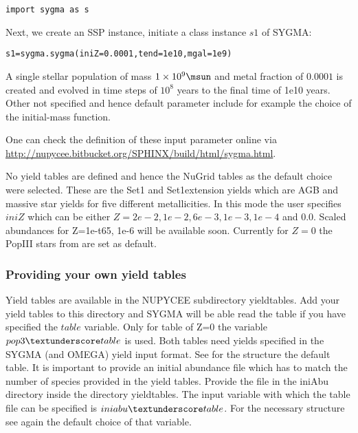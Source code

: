 \begin{verbatim}
import sygma as s
\end{verbatim}

Next, we create an SSP instance, initiate a class instance $s1$ of SYGMA:


\begin{verbatim}
s1=sygma.sygma(iniZ=0.0001,tend=1e10,mgal=1e9)
\end{verbatim}

A single stellar population of mass $1\times10^{9}\msun$ and metal fraction
of $0.0001$ is created and evolved in time steps of $10^{8}$ years
to the final time of 1e10 years. Other not specified and hence
default parameter include for example the choice of the initial-mass function.


One can check the definition of these input parameter online via
\url{http://nupycee.bitbucket.org/SPHINX/build/html/sygma.html}.


No yield tables are defined and hence the NuGrid tables as the
default choice were selected. These are the Set1 and Set1extension
yields which are
AGB and massive star yields for five different metallicities.
In this mode the user specifies $iniZ$
which can be either $Z=2e-2, 1e-2, 6e-3, 1e-3, 1e-4$ and $0.0$.
Scaled abundances for Z=1e-t65, 1e-6 will be available soon.
Currently for $Z=0$ the PopIII stars from \cite{heger:10} are set
as default.

\subsubsection{Providing your own yield tables}

Yield tables are available in the NUPYCEE subdirectory 
yield\textunderscore tables. Add your yield tables to
this directory and SYGMA will be able read the table
if you have specified the $table$ variable. Only
for table of Z=0 the variable $pop3\textunderscore table$ is used.
Both tables need yields specified in the SYGMA (and OMEGA)
yield input format. See for the structure the default table.
It is important to provide an initial abundance
file which has to match the number of species provided in the yield tables.
Provide the file in the iniAbu directory inside the directory yield\textunderscore tables.
The input variable with which the table file can be specified is $iniabu\textunderscore table$.
For the necessary structure see again the default choice of that variable.



